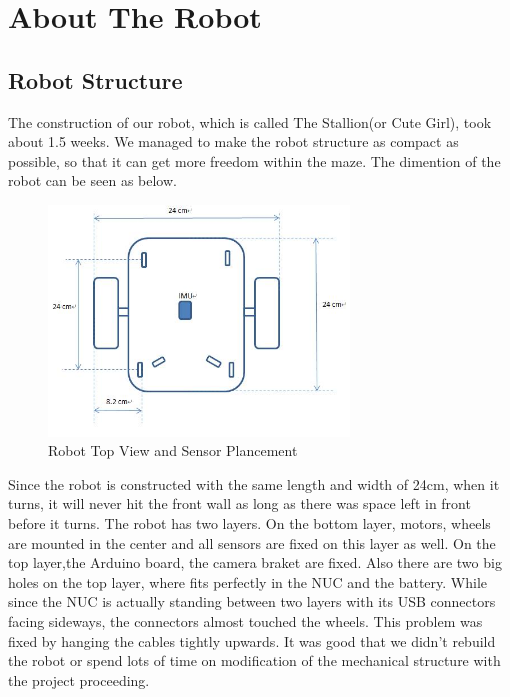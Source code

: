 \section{About The Robot}
\subsection{Robot Structure}

The construction of our robot, which is called The Stallion(or Cute Girl), took about 1.5 weeks.
We managed to make the robot structure as compact as possible, so that it can get more freedom within the maze.
The dimention of the robot can be seen as below.

\begin{figure}[h]
\centering
\includegraphics[width=8cm]{figures/dimensions.jpg}
\caption{Robot Top View and Sensor Plancement} 
\end{figure}

\setlength{\parindent}{0pt}Since the robot is constructed with the same length and width of 24cm, when it turns, it will never hit the front wall as long as there was space left in front before it turns.
The robot has two layers. On the bottom layer, motors, wheels are mounted in the center and all sensors are fixed on this layer as well.
On the top layer,the Arduino board, the camera braket are fixed.
Also there are two big holes on the top layer, where fits perfectly in the NUC and the battery.
While since the NUC is actually standing between two layers with its USB connectors facing sideways, the connectors almost touched the wheels.
This problem was fixed by hanging the cables tightly upwards.
It was good that we didn't rebuild the robot or spend lots of time on modification of the mechanical structure with the project proceeding. 

